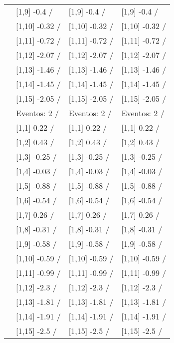 \begin{table}
\begin{tabular}[t]{llll}
\addlinespace
 & {}[1,9] -0.4  / & {}[1,9] -0.4  / & {}[1,9] -0.4  /\\
 & {}[1,10] -0.32  / & {}[1,10] -0.32  / & {}[1,10] -0.32  /\\
 & {}[1,11] -0.72  / & {}[1,11] -0.72  / & {}[1,11] -0.72  /\\
 & {}[1,12] -2.07  / & {}[1,12] -2.07  / & {}[1,12] -2.07  /\\
 & {}[1,13] -1.46  / & {}[1,13] -1.46  / & {}[1,13] -1.46  /\\
\addlinespace
 & {}[1,14] -1.45  / & {}[1,14] -1.45  / & {}[1,14] -1.45  /\\
 & {}[1,15] -2.05  / & {}[1,15] -2.05  / & {}[1,15] -2.05  /\\
 & Eventos:  2 / & Eventos:  2 / & Eventos:  2 /\\
 & {}[1,1] 0.22  / & {}[1,1] 0.22  / & {}[1,1] 0.22  /\\
 & {}[1,2] 0.43  / & {}[1,2] 0.43  / & {}[1,2] 0.43  /\\
\addlinespace
 & {}[1,3] -0.25  / & {}[1,3] -0.25  / & {}[1,3] -0.25  /\\
 & {}[1,4] -0.03  / & {}[1,4] -0.03  / & {}[1,4] -0.03  /\\
 & {}[1,5] -0.88  / & {}[1,5] -0.88  / & {}[1,5] -0.88  /\\
 & {}[1,6] -0.54  / & {}[1,6] -0.54  / & {}[1,6] -0.54  /\\
 & {}[1,7] 0.26  / & {}[1,7] 0.26  / & {}[1,7] 0.26  /\\
\addlinespace
500 & {}[1,8] -0.31  / & {}[1,8] -0.31  / & {}[1,8] -0.31  /\\
 & {}[1,9] -0.58  / & {}[1,9] -0.58  / & {}[1,9] -0.58  /\\
 & {}[1,10] -0.59  / & {}[1,10] -0.59  / & {}[1,10] -0.59  /\\
 & {}[1,11] -0.99  / & {}[1,11] -0.99  / & {}[1,11] -0.99  /\\
 & {}[1,12] -2.3  / & {}[1,12] -2.3  / & {}[1,12] -2.3  /\\
\addlinespace
 & {}[1,13] -1.81  / & {}[1,13] -1.81  / & {}[1,13] -1.81  /\\
 & {}[1,14] -1.91  / & {}[1,14] -1.91  / & {}[1,14] -1.91  /\\
 & {}[1,15] -2.5  / & {}[1,15] -2.5  / & {}[1,15] -2.5  /\\
\bottomrule
\end{tabular}
\end{table}
